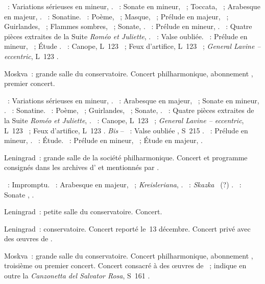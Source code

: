 \begin{description}
 \textsc{\Mendelssohn{}}~: Variations sérieuses en \kD mineur, .
 \textsc{\Schumann{}}~: Sonate en \kF mineur, ~; Toccata,
 ~; Arabesque en \kC majeur, .
 \textsc{\Ravel{}}~: Sonatine.
 \textsc{\Scriabine{}}~: Poème,  ~; Masque, 
 ~; Prélude en \kD \Flat majeur,  ~;
 Guirlandes,  ~; Flammes sombres,  ~;
 Sonate, .
 \textsc{\Rachmaninov{}}~: Prélude en \kC \Sharp mineur, 
 .
 \textsc{\Prokofiev{}}~: Quatre pièces extraites de la Suite \emph{Roméo et
 Juliette}, .
 \textsc{\Liszt{}}~: Valse oubliée.
 \textsc{\Chopin{}}~: Prélude en \kC \Sharp mineur,  ~;
 Étude .
 \textsc{\Debussy{}}~: Canope, L~123 ~; Feux d'artifice, L~123
 ~; \emph{General Lavine -- eccentric}, L~123 .
 \item[\DateWithWeekDay{1940-11-02}]
 Moskva~: grande salle du conservatoire.
 Concert philharmonique, abonnement , premier concert.

 \textsc{\Mendelssohn{}}~: Variations sérieuses en \kD mineur, .
 \textsc{\Schumann{}}~: Arabesque en \kC majeur, ~; Sonate en \kF
 mineur, .
 \textsc{\Ravel{}}~: Sonatine.
 \textsc{\Scriabine{}}~: Poème,  ~; Guirlandes, 
 ~; Sonate, .
 \textsc{\Prokofiev{}}~: Quatre pièces extraites de la Suite \emph{Roméo et
 Juliette}, .
 \textsc{\Debussy{}}~: Canope, L~123 ~; \emph{General Lavine --
 eccentric}, L~123 ~; Feux d'artifice, L~123 .
 \emph{Bis} -- \textsc{\Liszt{}}~: Valse oubliée , S~215
 .
 \textsc{\Rachmaninov{}}~: Prélude en \kC \Sharp mineur, 
 .
 \textsc{\Chopin{}}~: Étude.
 \textsc{\Scriabine{}}~: Prélude en \kC \Sharp mineur, 
 ~; Étude en \kD \Flat majeur,  .
 \item[\DateWithWeekDay{1940-11-24}]
 Leningrad~: grande salle de la société philharmonique.
 Concert et programme consignés dans les archives d'\AVizel{} et mentionnés
 par \citet[p.~162]{Nekrasova08}.

 \textsc{\Schubert{}}~: Impromptu.
 \textsc{\Schumann{}}~: Arabesque en \kC majeur, ~;
 \emph{Kreisleriana}, .
 \textsc{\Medtner{}}~: \emph{Skazka} ~(?) .
 \textsc{\Scriabine{}}~: Sonate , .
 \item[\DateWithWeekDay{1940-11-25}]
 Leningrad~: petite salle du conservatoire.
 Concert.
 \item[\DateWithWeekDay{1940-11-29}]
 Leningrad~: conservatoire.
 Concert reporté le~13 décembre.
 Concert privé avec des œuvres de \Prokofiev{}.
 \item[\DateWithWeekDay{1940-12-02}]
 Moskva~: grande salle du conservatoire.
 Concert philharmonique, abonnement , troisième
 \citep[p.~417]{Scriabine} ou premier \citep[p.~162]{Nekrasova08} concert.
 Concert consacré à des œuvres de \Liszt{}~; \citeauthor{Nekrasova08}
 indique en outre la \emph{Canzonetta del Salvator Rosa}, S~161 .


\end{description}
